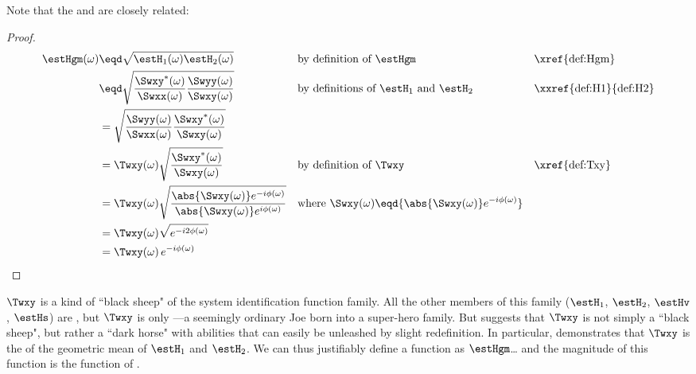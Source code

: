 \begin{remark}
\label{rem:HgmTxy_mag}
Note that the   and  
are closely related:
\end{remark}
\begin{proof}
\begin{align*}
  \estHgm(\omega) 
    &\eqd \sqrt{\estH_1(\omega)\estH_2(\omega)}
    && \text{by definition of $\estHgm$}
    && \text{\xref{def:Hgm}}
  \\&\eqd \sqrt{\frac{\Swxy^\ast(\omega)}{\Swxx(\omega)}\frac{\Swyy(\omega)}{\Swxy(\omega)}}
    && \text{by definitions of $\estH_1$ and $\estH_2$}
    && \text{\xxref{def:H1}{def:H2}}
  \\&= \sqrt{\frac{\Swyy(\omega)}{\Swxx(\omega)}\frac{\Swxy^\ast(\omega)}{\Swxy(\omega)}}
  \\&= \Twxy(\omega)\sqrt{\frac{\Swxy^\ast(\omega)}{\Swxy(\omega)}}
    && \text{by definition of $\Twxy$}
    && \text{\xref{def:Txy}}
  \\&= \Twxy(\omega)\sqrt{\frac{\abs{\Swxy(\omega)}e^{-i\phi(\omega)}}{\abs{\Swxy(\omega)}e^{i\phi(\omega)}}}
    && \text{where $\Swxy(\omega)\eqd{\abs{\Swxy(\omega)}e^{-i\phi(\omega)}}$}
  \\&= \Twxy(\omega)\sqrt{e^{-i2\phi(\omega)}}
  \\&= \Twxy(\omega)\,e^{-i\phi(\omega)}
\end{align*}
\end{proof}

\begin{remark}
\label{rem:HgmTxy_gen}
 $\Twxy$ is a kind of ``black sheep" of the system identification function family. 
All the other members of this family ($\estH_1$, $\estH_2$, $\estHv$, $\estHs$) are ,
but $\Twxy$ is only ---a seemingly ordinary Joe born into a super-hero family.
But  suggests that $\Twxy$ is not simply a ``black sheep", but 
rather a ``dark horse" with abilities that can easily be unleashed by slight redefinition. 
In particular,  demonstrates that $\Twxy$ is the  of the geometric mean of 
$\estH_1$ and $\estH_2$.
We can thus justifiably define a  function as $\estHgm$\ldots
and the magnitude of this  function is the 
function of .
\end{remark}

